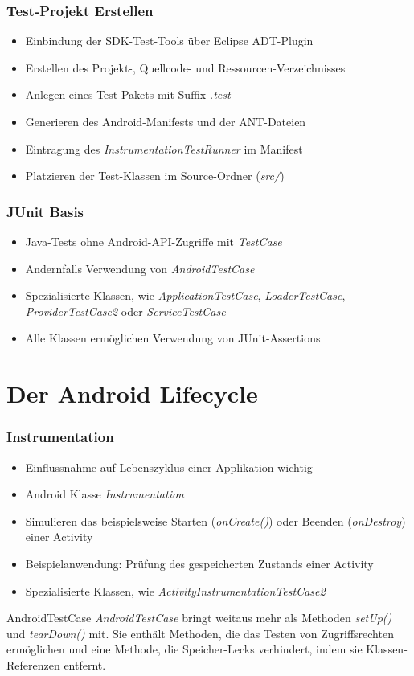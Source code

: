 \begin{frame}
	\frametitle{Test-Projekt Erstellen}
	\begin{itemize}
		\item Einbindung der SDK-Test-Tools über Eclipse ADT-Plugin
		\item Erstellen des Projekt-, Quellcode- und Ressourcen-Verzeichnisses
		\item Anlegen eines Test-Pakets mit Suffix \emph{.test}
		\item Generieren des Android-Manifests und der ANT-Dateien
		\item Eintragung des \emph{InstrumentationTestRunner} im Manifest
		\item Platzieren der Test-Klassen im Source-Ordner (\emph{src/})
	\end{itemize}
\end{frame}

\begin{frame}
	\frametitle{JUnit Basis}
	\begin{itemize}
		\item Java-Tests ohne Android-API-Zugriffe mit \emph{TestCase}
		\item Andernfalls Verwendung von \emph{AndroidTestCase}
		\item Spezialisierte Klassen, wie \emph{ApplicationTestCase}, 
			\emph{LoaderTestCase}, \emph{ProviderTestCase2} oder \emph{ServiceTestCase}
		\item Alle Klassen ermöglichen Verwendung von JUnit-Assertions
	\end{itemize}
\end{frame}

\section{Der Android Lifecycle}

\begin{frame}
	\frametitle{Instrumentation}
	\begin{itemize}
		\item Einflussnahme auf Lebenszyklus einer Applikation wichtig
		\item Android Klasse \emph{Instrumentation}
		\item Simulieren das beispielsweise Starten (\emph{onCreate()}) 
			oder Beenden (\emph{onDestroy}) einer Activity
		\item Beispielanwendung: Prüfung des gespeicherten Zustands einer Activity
		\item Spezialisierte Klassen, wie \emph{ActivityInstrumentationTestCase2}
	\end{itemize}
	
	\begin{alertblock}{AndroidTestCase}
		\emph{AndroidTestCase} bringt weitaus mehr als Methoden \emph{setUp()} und \emph{tearDown()} mit. 
		Sie enthält Methoden, die das Testen von Zugriffsrechten ermöglichen und 
		eine Methode, die Speicher-Lecks verhindert, indem sie Klassen-Referenzen entfernt.
	\end{alertblock}
\end{frame}

